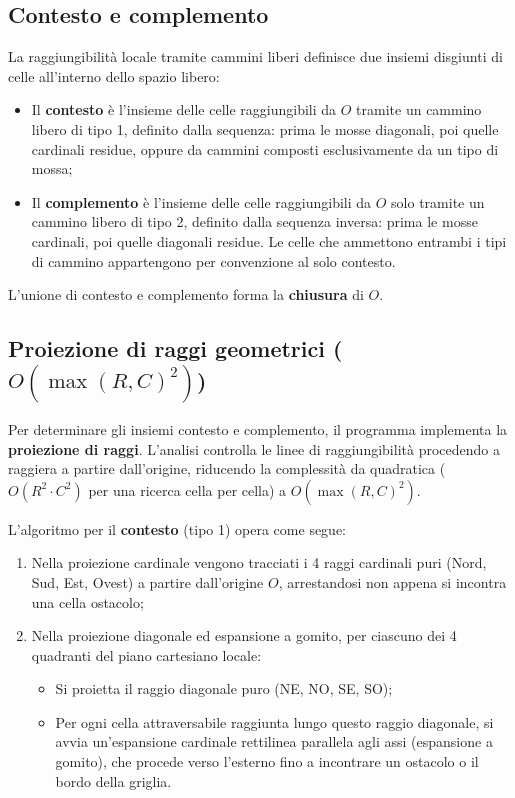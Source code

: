 \subsection{Contesto e complemento}

La raggiungibilità locale tramite cammini liberi definisce due insiemi disgiunti di celle all'interno dello spazio libero:
\begin{itemize}
    \item Il \textbf{contesto} è l'insieme delle celle raggiungibili da $O$ tramite un cammino libero di tipo 1, definito dalla sequenza: prima le mosse diagonali, poi quelle cardinali residue, oppure da cammini composti esclusivamente da un tipo di mossa;
    \item Il \textbf{complemento} è l'insieme delle celle raggiungibili da $O$ solo tramite un cammino libero di tipo 2, definito dalla sequenza inversa: prima le mosse cardinali, poi quelle diagonali residue. Le celle che ammettono entrambi i tipi di cammino appartengono per convenzione al solo contesto.
\end{itemize}
L'unione di contesto e complemento forma la \textbf{chiusura} di $O$.

\subsection{Proiezione di raggi geometrici ($O(\max(R,C)^2)$)}

Per determinare gli insiemi contesto e complemento, il programma implementa la \textbf{proiezione di raggi}. L'analisi controlla le linee di raggiungibilità procedendo a raggiera a partire dall'origine, riducendo la complessità da quadratica ($O(R^2 \cdot C^2)$ per una ricerca cella per cella) a $O(\max(R,C)^2)$.

L'algoritmo per il \textbf{contesto} (tipo 1) opera come segue:
\begin{enumerate}
    \item Nella proiezione cardinale vengono tracciati i 4 raggi cardinali puri (Nord, Sud, Est, Ovest) a partire dall'origine $O$, arrestandosi non appena si incontra una cella ostacolo;
    \item Nella proiezione diagonale ed espansione a gomito, per ciascuno dei 4 quadranti del piano cartesiano locale:
    \begin{itemize}
        \item Si proietta il raggio diagonale puro (NE, NO, SE, SO);
        \item Per ogni cella attraversabile raggiunta lungo questo raggio diagonale, si avvia un'espansione cardinale rettilinea parallela agli assi (espansione a gomito), che procede verso l'esterno fino a incontrare un ostacolo o il bordo della griglia.
    \end{itemize}
\end{enumerate}

